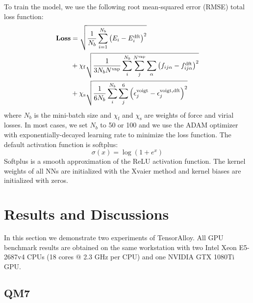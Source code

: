\documentclass[final,1p,times]{elsarticle}
\begin{document}
To train the model, we use the following root mean-squared error (RMSE) total 
loss function:
\begin{align}
\label{eq:loss}
\mathbf{Loss} & = \sqrt{\frac{1}{N_{b}}\sum_{i=1}^{N_{b}}{\left(
    E_{i} - E_{i}^{\mathrm{dft}}
\right)^2}} \nonumber \\
& + \chi_{\mathrm{f}}\sqrt{
    \frac{1}{3 N_{b} N^{\mathrm{vap}}}\sum_{i}^{N_b}{\sum_{j}^{N^{\mathrm{vap}}}{
        \sum_{\alpha}{
            \left(f_{ij\alpha} - f_{ij\alpha}^{\mathrm{dft}}\right)^2
        }
    }}
} \nonumber \\
& + \chi_{\mathrm{s}}\sqrt{\frac{1}{6N_b}\sum_{i}^{N_b}{
    \sum_{j}^{6}{
        \left(
            \epsilon^{\mathrm{voigt}}_{j} - \epsilon^{\mathrm{voigt,dft}}_{j}
        \right)^2
    }
}}
\end{align}
where $N_b$ is the mini-batch size and $\chi_{\mathrm{f}}$ and 
$\chi_{\mathrm{s}}$ are weights of force and virial losses. 
In most cases, we set $N_b$ to 50 or 100 and we
use the ADAM\cite{adam} optimizer with exponentially-decayed learning rate to 
minimize the loss function. The default activation function is softplus:
\begin{equation}
\sigma(x) = \log(1 + e^x)
\end{equation}
Softplus is a smooth approximation of the ReLU activation function.
The kernel weights of all NNs are initialized with the 
Xvaier method\cite{pmlr-v9-glorot10a} and kernel biases are initialized with 
zeros.

% 
%
\section{Results and Discussions}
\label{section:discussions}

In this section we demonstrate two experiments of TensorAlloy. All GPU benchmark
results are obtained on the same workstation with two Intel Xeon E5-2687v4 CPUs
(18 cores @ 2.3 GHz per CPU) and one NVIDIA GTX 1080Ti GPU.

% 
%
\subsection{QM7}
\end{document}

